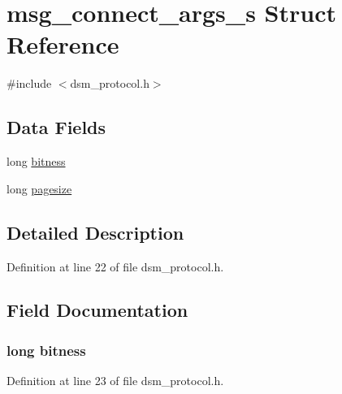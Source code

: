 \hypertarget{structmsg__connect__args__s}{}\section{msg\+\_\+connect\+\_\+args\+\_\+s Struct Reference}
\label{structmsg__connect__args__s}


{\ttfamily \#include $<$dsm\+\_\+protocol.\+h$>$}

\subsection*{Data Fields}
\begin{DoxyCompactItemize}
\item 
long \hyperlink{structmsg__connect__args__s_a5072c12ef0826b0a91fc6cc4ef1c5269}{bitness}
\item 
long \hyperlink{structmsg__connect__args__s_a29671842af1d917af8aa77327c489da0}{pagesize}
\end{DoxyCompactItemize}


\subsection{Detailed Description}


Definition at line 22 of file dsm\+\_\+protocol.\+h.



\subsection{Field Documentation}
\subsubsection[{\texorpdfstring{bitness}{bitness}}]{\setlength{\rightskip}{0pt plus 5cm}long bitness}\hypertarget{structmsg__connect__args__s_a5072c12ef0826b0a91fc6cc4ef1c5269}{}\label{structmsg__connect__args__s_a5072c12ef0826b0a91fc6cc4ef1c5269}


Definition at line 23 of file dsm\+\_\+protocol.\+h.


